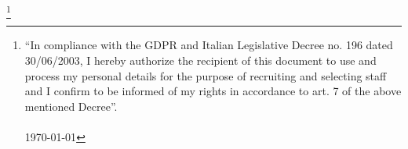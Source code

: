 \documentclass[a4,oneside]{friggeri-cv}
\newcommand\blfootnote[1]{%
  \begingroup
  \renewcommand\thefootnote{}\footnote{#1}%
  \addtocounter{footnote}{-1}%
  \endgroup
}
\begin{document}
%
%
%
%
%
%
%
\blfootnote{“In compliance with the GDPR and Italian Legislative Decree no. 196
dated 30/06/2003, I hereby authorize the recipient of this document to use and
process my personal details for the purpose of recruiting and selecting staff
and I confirm to be informed of my rights in accordance to art. 7 of the above
mentioned Decree”.\\\\
\today}
\end{document}
